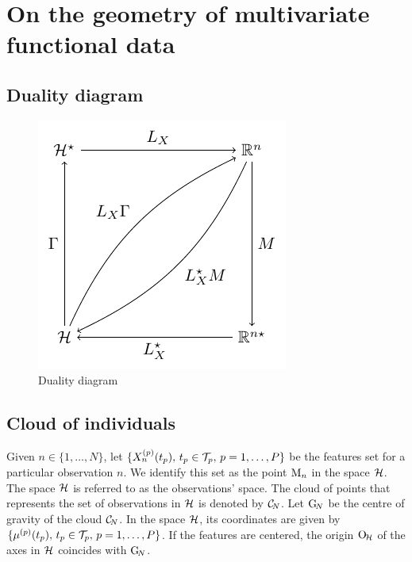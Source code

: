 \section{On the geometry of multivariate functional data} %
\label{sec:geometric_point_of_view_mfpca}

\subsection{Duality diagram} %
\label{sub:duality_diagram}

\begin{figure}
    \centering
    \includegraphics[scale=1.2]{figures/duality_diagram.pdf}
    \caption{Duality diagram}
    \label{fig:duality_diagram}
\end{figure}



\subsection{Cloud of individuals} %
\label{sub:cloud_of_individuals}

Given $n \in \{1, \dots, N\}$, let $\{X_n^{(p)}(t_p),\,t_p \in \mathcal{T}_{p},\,p = 1, \dots, P\}$ be the features set for a particular observation $n$. We identify this set as the point $\mathrm{M}_n$ in the space $\mathcal{H}$. The space $\mathcal{H}$ is referred to as the observations' space. The cloud of points that represents the set of observations in $\mathcal{H}$ is denoted by $\mathcal{C}_{\!N}$. Let $\mathrm{G}_{\!N}$ be the centre of gravity of the cloud $\mathcal{C}_{\!N}$. In the space $\mathcal{H}$, its coordinates are given by $\{\mu^{(p)}(t_p),\,t_p \in \mathcal{T}_{p},\,p = 1, \dots, P\}$. If the features are centered, the origin $\mathrm{O}_{\!\mathcal{H}}$ of the axes in $\mathcal{H}$ coincides with $\mathrm{G}_{\!N}$.

